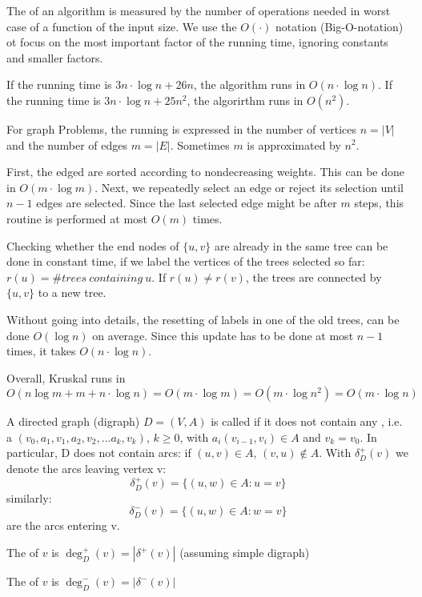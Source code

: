 \begin{lec}[2011-10-17]\end{lec}

\begin{defn+}
The  of an algorithm is measured by the number of operations needed in worst case of a function of the input size. We use the $O(\cdot)$ notation (Big-O-notation) ot focus on the most important factor of the running time, ignoring constants and smaller factors.
\end{defn+}

\begin{xmp+}
	If the running time is $3n \cdot \log n + 26n$, the algorithm runs in $O(n \cdot \log n)$. If the running time is $3n \cdot \log n + 25 n^2$, the algorirthm runs in $O(n^2)$.
\end{xmp+}

For graph Problems, the running is expressed in the number of vertices $n=|V|$ and the number of edges $m=|E|$. Sometimes $m$ is approximated by $n^2$.

\begin{xmp+}
	First, the edged are sorted according to nondecreasing weights. This can be done in $O(m\cdot \log m)$. Next, we repeatedly select an edge or reject its selection until $n-1$ edges are selected. Since the last selected edge might be after $m$ steps, this routine is performed at most $O(m)$ times.
	
	Checking whether the end nodes of $\{u,v\}$ are already in the same tree can be done in constant time, if we label the vertices of the trees selected so far: $r(u) = \# trees\: containing\: u$. If $r(u) \neq r(v)$, the trees are connected by $\{u,v\}$ to a new tree. 
	
	Without going into details, the resetting of labels in one of the old trees, can be done $O(\log n)$ on average. Since this update has to be done at most $n-1$ times, it takes $O(n\cdot \log n)$. 
	
	Overall, Kruskal runs in \[ O(n \log m + m + n \cdot \log n) = O(m \cdot \log m) = O(m \cdot \log n^2) = O(m \cdot \log n) \]
\end{xmp+}

\begin{defn+}
A directed graph (digraph) $D=(V,A)$  is called  if it does not contain any
, i.e. a  $(v_0,a_1,v_1,a_2,v_2, ... a_k,v_k)$, $k \geq 0$, with $a_i(v_{i-1},v_i) \in A$ and $v_k = v_0$. In particular, D does not contain
 arcs: if $(u,v)\in A$, $(v,u)\not \in A$. With $\delta_D^+(v)$ we denote the arcs leaving vertex v: 
\[ \delta_D^+(v) = \{(u,w) \in A: u = v\}\]
similarly:
\[\delta_D^-(v) = \{(u,w) \in A: w = v\}\]
are the arcs entering v.

The  of $v$ is $\deg^+_D(v) = | \delta^+(v) |$ (assuming simple digraph)

The  of $v$ is $\deg^-_D(v) = | \delta^-(v)|$
\end{defn+}

